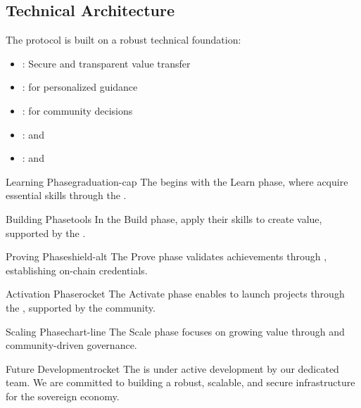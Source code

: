 \subsection{Technical Architecture}

The protocol is built on a robust technical foundation:

\begin{itemize}[leftmargin=*]
\item {}: Secure and transparent value transfer
\item {}:  for personalized guidance
\item {}:  for community decisions
\item {}:  and 
\item {}:  and 
\end{itemize}

\begin{mfai-box-learn}{Learning Phase}{graduation-cap}
The  begins with the Learn phase, where  acquire essential skills through the .
\end{mfai-box-learn}

\begin{mfai-box-build}{Building Phase}{tools}
In the Build phase,  apply their skills to create value, supported by the .
\end{mfai-box-build}

\begin{mfai-box-prove}{Proving Phase}{shield-alt}
The Prove phase validates achievements through , establishing on-chain credentials.
\end{mfai-box-prove}

\begin{mfai-box-activate}{Activation Phase}{rocket}
The Activate phase enables  to launch projects through the , supported by the community.
\end{mfai-box-activate}

\begin{mfai-box-scale}{Scaling Phase}{chart-line}
The Scale phase focuses on growing value through  and community-driven governance.
\end{mfai-box-scale}

\begin{mfai-box-star}{Future Development}{rocket}
The  is under active development by our dedicated team. We are committed to building a robust, scalable, and secure infrastructure for the sovereign  economy.
\end{mfai-box-star}

\newpage 